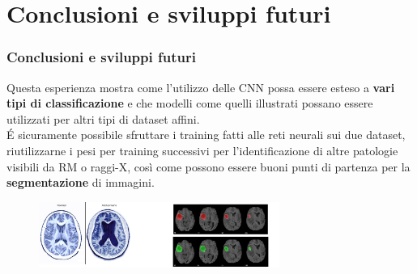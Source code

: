 \documentclass{beamer}
\begin{document}

\section{Conclusioni e sviluppi futuri}
\begin{frame}
	\frametitle{Conclusioni e sviluppi futuri}
	Questa esperienza mostra come l'utilizzo delle CNN possa essere esteso a \textbf{vari tipi di classificazione} e che 
	modelli come quelli illustrati possano essere utilizzati per altri tipi di dataset affini. \\
	É sicuramente possibile sfruttare
	i training fatti alle reti neurali sui due dataset, riutilizzarne i pesi per training successivi
	 per l'identificazione di altre patologie visibili da RM o raggi-X, così come possono essere buoni punti di partenza per 
	 la \textbf{segmentazione} di immagini.
	 \begin{figure}
		\includegraphics[width=0.7\textwidth]{alzheimer.jpg}
	\end{figure}

\end{frame}


\begin{frame}

\end{frame}
\end{document}
